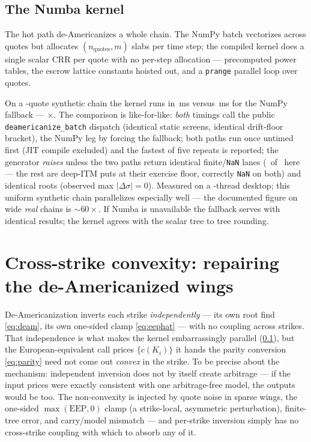 \documentclass[11pt]{article}
\begin{document}
\subsection{The Numba kernel}
\label{sec:numba}

The hot path de-Americanizes a whole chain. The NumPy batch vectorizes across
quotes but allocates $(n_{\text{quotes}},m)$ slabs per time step; the compiled
kernel does a single scalar CRR per quote with no per-step allocation ---
precomputed power tables, the escrow lattice constants hoisted out, and a
\texttt{prange} parallel loop over quotes.

\begin{perfbox}
On a \deamchainn-quote synthetic chain the kernel runs in \deamnumbams\,ms
versus \deamnumpyms\,ms for the NumPy fallback --- \deamspeedup$\times$.
The comparison is like-for-like: \emph{both} timings call the public
\texttt{deamericanize\_batch} dispatch (identical static screens, identical
drift-floor bracket), the NumPy leg by forcing the fallback; both paths run
once untimed first (JIT compile excluded) and the fastest of five repeats is
reported; the generator \emph{raises} unless the two paths return identical
finite/\texttt{NaN} lanes (\deamchainfinite\ of \deamchainn\ here --- the rest
are deep-ITM puts at their exercise floor, correctly \texttt{NaN} on both) and
identical roots (observed max $|\Delta\sigma|=0$). Measured on a
\deamthreads-thread desktop; this uniform synthetic chain parallelizes
especially well --- the documented figure on wide \emph{real} chains is
$\sim60\times$. If Numba is unavailable the fallback serves with identical
results; the kernel agrees with the scalar tree to tree rounding.
\end{perfbox}

\section{Cross-strike convexity: repairing the de-Americanized wings}
\label{sec:convex}

De-Americanization inverts each strike \emph{independently} --- its own root
find \eqref{eq:deam}, its own one-sided clamp \eqref{eq:eephat} --- with no
coupling across strikes. That independence is what makes the kernel
embarrassingly parallel (\cref{sec:numba}), but the European-equivalent call
prices $\{c(K_i)\}$ it hands the parity conversion \eqref{eq:parity} need not
come out \emph{convex} in the strike. To be precise about the mechanism:
independent inversion does not by itself create arbitrage --- if the input
prices were exactly consistent with one arbitrage-free model, the outputs would
be too. The non-convexity is injected by quote noise in sparse wings, the
one-sided $\max(\mathrm{EEP},0)$ clamp (a strike-local, asymmetric
perturbation), finite-tree error, and carry/model mismatch --- and per-strike
inversion simply has no cross-strike coupling with which to absorb any of it.
\end{document}

